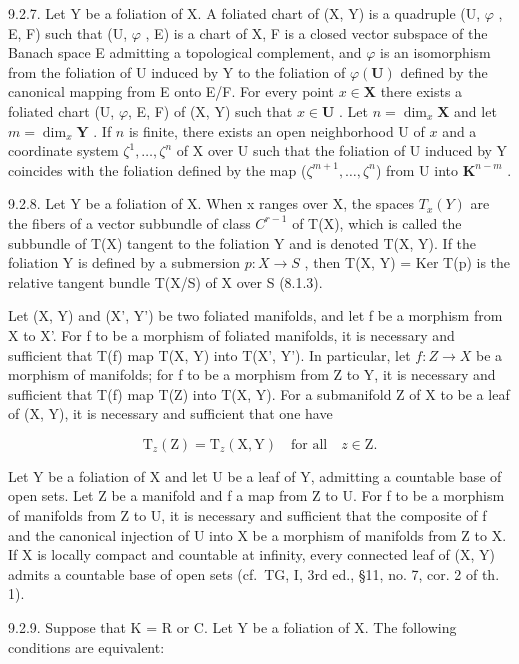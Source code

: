 9.2.7. Let Y be a foliation of X. A foliated chart of (X, Y) is a quadruple (U, \(\varphi\) , E, F) such that (U, \(\varphi\) , E) is a chart of X, F is a closed vector subspace of the Banach space E admitting a topological complement, and \(\varphi\) is an isomorphism from the foliation of U induced by Y to the foliation of \(\varphi(\mathbf{U})\) defined by the canonical mapping from E onto E/F. For every point \(x \in \mathbf{X}\) there exists a foliated chart (U, \(\varphi\), E, F) of (X, Y) such that \(x \in \mathbf{U}\) . Let \(n = \dim_x \mathbf{X}\) and let \(m = \dim_x \mathbf{Y}\) . If \(n\) is finite, there exists an open neighborhood U of \(x\) and a coordinate system \(\zeta^1, \ldots, \zeta^n\) of X over U such that the foliation of U induced by Y coincides with the foliation defined by the map (\(\zeta^{m+1}, \ldots, \zeta^n\)) from U into \(\mathbf{K}^{n-m}\) .

9.2.8. Let Y be a foliation of X. When x ranges over X, the spaces \(T_{x}(Y)\) are the fibers of a vector subbundle of class \(C^{r-1}\) of T(X), which is called the subbundle of T(X) tangent to the foliation Y and is denoted T(X, Y). If the foliation Y is defined by a submersion \(p: X \to S\) , then T(X, Y) = Ker T(p) is the relative tangent bundle T(X/S) of X over S (8.1.3).

Let (X, Y) and (X', Y') be two foliated manifolds, and let f be a morphism from X to X'. For f to be a morphism of foliated manifolds, it is necessary and sufficient that T(f) map T(X, Y) into T(X', Y'). In particular, let \(f: Z \to X\) be a morphism of manifolds; for f to be a morphism from Z to Y, it is necessary and sufficient that T(f) map T(Z) into T(X, Y). For a submanifold Z of X to be a leaf of (X, Y), it is necessary and sufficient that one have

\[
\mathrm{T} _ {z} (\mathrm{Z}) = \mathrm{T} _ {z} (\mathrm{X}, \mathrm{Y}) \quad \text {for all} \quad z \in \mathrm{Z}.
\]

Let Y be a foliation of X and let U be a leaf of Y, admitting a countable base of open sets. Let Z be a manifold and f a map from Z to U. For f to be a morphism of manifolds from Z to U, it is necessary and sufficient that the composite of f and the canonical injection of U into X be a morphism of manifolds from Z to X. If X is locally compact and countable at infinity, every connected leaf of (X, Y) admits a countable base of open sets (cf.~TG, I, 3rd ed., §11, no. 7, cor. 2 of th. 1).

9.2.9. Suppose that K = R or C. Let Y be a foliation of X. The following conditions are equivalent:

